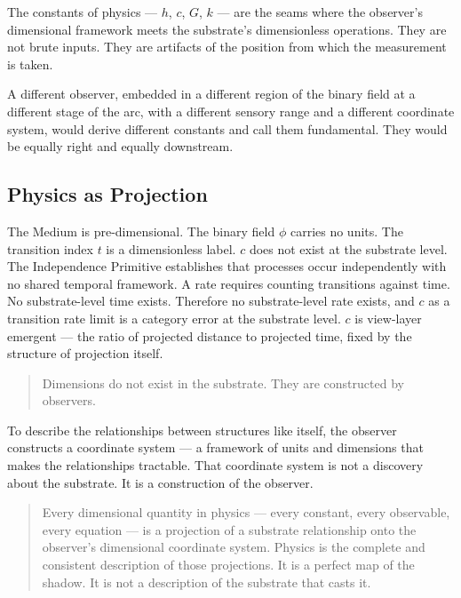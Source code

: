 \documentclass[11pt,letterpaper]{article}
\begin{document}
The constants of physics --- \(h\), \(c\), \(G\), \(k\) --- are the seams where the observer's dimensional framework meets the substrate's dimensionless operations. They are not brute inputs. They are artifacts of the position from which the measurement is taken.

A different observer, embedded in a different region of the binary field at a different stage of the arc, with a different sensory range and a different coordinate system, would derive different constants and call them fundamental. They would be equally right and equally downstream.

\subsection{Physics as Projection}
\label{sec:org3ffc2a8}

The Medium is pre-dimensional. The binary field \(\phi\) carries no units. The transition index \(t\) is a dimensionless label. \(c\) does not exist at the substrate level. The Independence Primitive establishes that processes occur independently with no shared temporal framework. A rate requires counting transitions against time. No substrate-level time exists. Therefore no substrate-level rate exists, and \(c\) as a transition rate limit is a category error at the substrate level. \(c\) is view-layer emergent --- the ratio of projected distance to projected time, fixed by the structure of projection itself.

\begin{quote}
Dimensions do not exist in the substrate. They are constructed by observers.
\end{quote}

To describe the relationships between structures like itself, the observer constructs a coordinate system --- a framework of units and dimensions that makes the relationships tractable. That coordinate system is not a discovery about the substrate. It is a construction of the observer.

\begin{quote}
Every dimensional quantity in physics --- every constant, every observable, every equation --- is a projection of a substrate relationship onto the observer's dimensional coordinate system. Physics is the complete and consistent description of those projections. It is a perfect map of the shadow. It is not a description of the substrate that casts it.
\end{quote}
\end{document}
